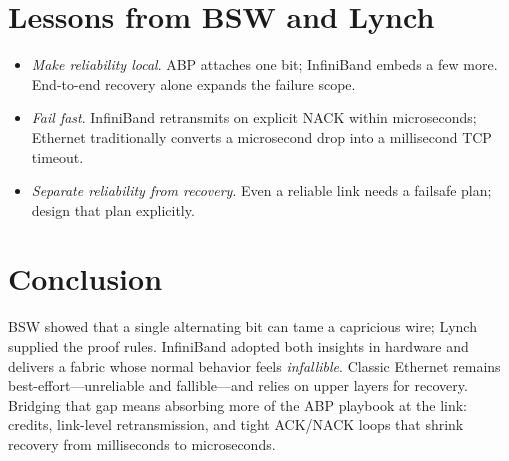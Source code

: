 {{{{{{\section{Lessons from BSW and Lynch}

\begin{itemize}
\item \emph{Make reliability local}.  ABP attaches one bit; InfiniBand embeds
      a few more.  End-to-end recovery alone expands the failure scope.
\item \emph{Fail fast}.  InfiniBand retransmits on explicit NACK within
      microseconds; Ethernet traditionally converts a microsecond drop into a
      millisecond TCP timeout.
\item \emph{Separate reliability from recovery}.  Even a reliable link needs
      a failsafe plan; design that plan explicitly.
\end{itemize}

\section{Conclusion}

\begin{highlightbox}[CONCLUSION:]
\noindent
BSW showed that a single alternating bit can tame a capricious wire; Lynch
supplied the proof rules.  InfiniBand adopted both insights in hardware and
delivers a fabric whose normal behavior feels \emph{infallible}.  Classic
Ethernet remains best-effort---unreliable and fallible---and relies on upper
layers for recovery.  Bridging that gap means absorbing more of the ABP
playbook at the link: credits, link-level retransmission, and tight ACK/NACK
loops that shrink recovery from milliseconds to microseconds.
\end{highlightbox}
 

%
%
%
%
%

}}}}}}
